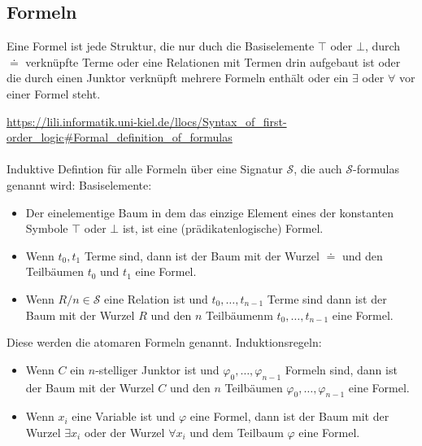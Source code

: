 \documentclass{article}
\begin{document}
    \subsection{Formeln}
    \begin{tcolorbox}
    Eine Formel ist jede Struktur, die nur duch die Basiselemente $\top$ oder $\bot$, durch $\doteq$ verknüpfte Terme oder eine Relationen mit Termen drin aufgebaut ist oder die durch einen Junktor verknüpft mehrere Formeln enthält oder ein $\exists$ oder $\forall$ vor einer Formel steht.
    \end{tcolorbox}
    \url{https://lili.informatik.uni-kiel.de/llocs/Syntax_of_first-order_logic#Formal_definition_of_formulas}\\\\
    Induktive Defintion für alle Formeln über eine Signatur $\mathcal{S}$, die auch $\mathcal{S}$-formulas genannt wird:
    Basiselemente:\\
    \begin{itemize}
        \item Der einelementige Baum in dem das einzige Element eines der konstanten Symbole $\top$ oder $\bot$ ist, ist eine (prädikatenlogische) Formel.
        \item Wenn $t_0,t_1$ Terme sind, dann ist der Baum mit der Wurzel $\doteq$ und den Teilbäumen $t_0$ und $t_1$ eine Formel.
        \item Wenn $R/n \in \mathcal S$ eine Relation ist und $t_0,\dots,t_{n-1}$ Terme sind dann ist der Baum mit der Wurzel $R$ und den $n$ Teilbäumenm $t_0, \dots, t_{n-1}$ eine Formel.
    \end{itemize}
    Diese werden die atomaren Formeln genannt.
    Induktionsregeln:\\
    \begin{itemize}
        \item Wenn $C$ ein $n$-stelliger Junktor ist und $\varphi_0,\dots,\varphi_{n-1}$ Formeln sind, dann ist der Baum mit der Wurzel $C$ und den $n$ Teilbäumen $\varphi_0,\dots,\varphi_{n-1}$ eine Formel.
        \item Wenn $x_i$ eine Variable ist und $\varphi$ eine Formel, dann ist der Baum mit der Wurzel $\exists x_i$ oder der Wurzel $\forall x_i$ und dem Teilbaum $\varphi$ eine Formel.
    \end{itemize}
\end{document}
